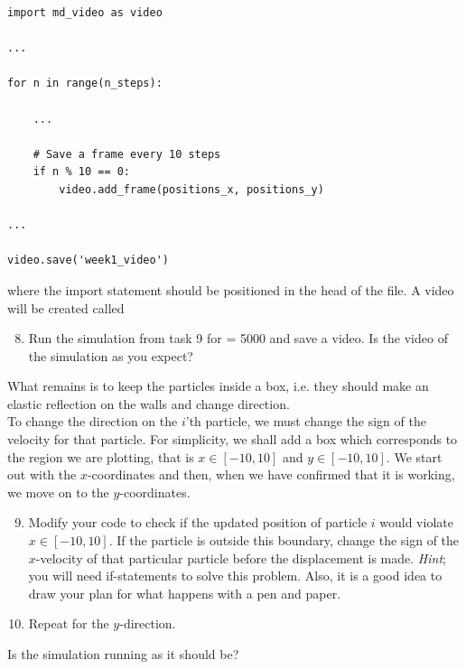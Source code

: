 \documentclass{article}
\begin{document}
\begin{lstlisting}
import md_video as video

...

for n in range(n_steps):

    ...

    # Save a frame every 10 steps
    if n % 10 == 0:
        video.add_frame(positions_x, positions_y)

...

video.save('week1_video')

\end{lstlisting}

where the import statement should be positioned in the head of the file.
A video will be created called 

\begin{enumerate}
  \setcounter{enumi}{7}
  \item Run the simulation from task 9 for  = 5000 and save a video.
    Is the video of the simulation as you expect?

\end{enumerate}

What remains is to keep the particles inside a box, i.e. they should make an elastic reflection on the walls and change direction. \\

To change the direction on the $i$'th particle, we must change the sign of the velocity for that particle.
For simplicity, we shall add a box which corresponds to the region we are plotting, that is $x \in [-10,10]$ and $y \in [-10,10]$.
We start out with the $x$-coordinates and then, when we have confirmed that it is working, we move on to the $y$-coordinates.

\begin{enumerate}
  \setcounter{enumi}{8}
  \item Modify your code to check if the updated position of particle $i$ would violate $x \in [-10,10]$.
      If the particle is outside this boundary, change the sign of the $x$-velocity of that
      particular particle before the displacement is made.
      {\em Hint}; you will need if-statements to solve this problem. Also, it is a good idea to draw your plan for what happens with a pen and paper.

  \item Repeat for the $y$-direction.

\end{enumerate}

Is the simulation running as it should be?

\end{document}
